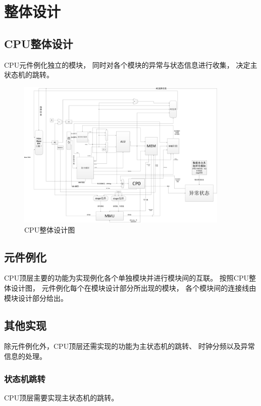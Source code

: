 \section{整体设计}
    \subsection{CPU整体设计}
        CPU元件例化独立的模块，%
        同时对各个模块的异常与状态信息进行收集，%
        决定主状态机的跳转。

        \begin{figure}[!hbp]
            \centering
            \caption{CPU整体设计图}
            \includegraphics[width=0.9\textwidth]{chart/CPU.jpg}
        \end{figure}

    \subsection{元件例化}
        CPU顶层主要的功能为实现例化各个单独模块并进行模块间的互联。%
        按照CPU整体设计图，%
        元件例化每个在模块设计部分所出现的模块，%
        各个模块间的连接线由模块设计部分给出。

    \subsection{其他实现}
        除元件例化外，CPU顶层还需实现的功能为主状态机的跳转、%
        时钟分频以及异常信息的处理。

        \subsubsection{状态机跳转}
            CPU顶层需要实现主状态机的跳转。

